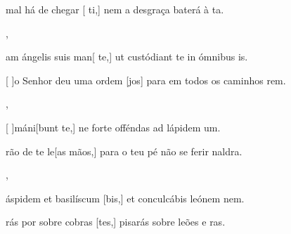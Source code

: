 {    {\item {} mal há de chegar [ ti,] nem a desgraça baterá à ta.},
  {\item {}am ángelis suis man[ te,] ut custódiant te in ómnibus is.}%
    {\item {}[ ]{o} Senhor deu uma ordem [jos] para em todos os caminhos rem.},
  {\item {}[ ]{má}ni[bunt te,] ne forte offéndas ad lápidem um.}%
    {\item {}rão de te le[as mãos,] para o teu pé não se ferir naldra.},
  {\item {} áspidem et basilíscum [bis,] et conculcábis leónem nem.}%
    {\item {}rás por sobre cobras [tes,] pisarás sobre leões e ras.}
}